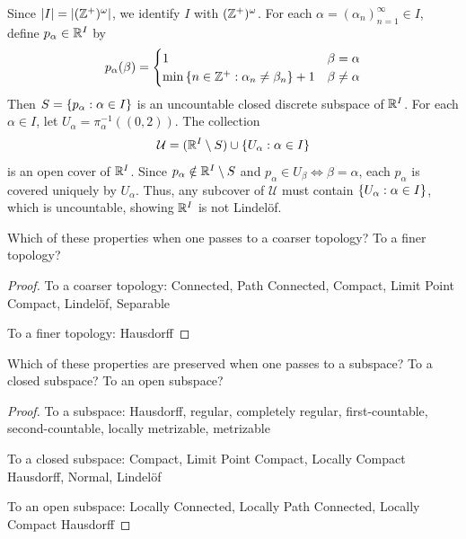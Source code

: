 \documentclass[12pt,a4paper]{article}
\begin{document}
\begin{ex}
\begin{itemize}
\begin{remark}
                Since $\left\lvert I\right\rvert=\left\lvert (\mathbb{Z}^+)^\omega\right\rvert$, we identify $I$ with $(\mathbb{Z}^+)^\omega$. For each $\alpha=(\alpha_n)_{n=1}^\infty\in I$, define $p_\alpha\in\mathbb{R}^I$ by
                $$
                p_\alpha(\beta) = \begin{cases}
                    1 & \beta=\alpha \\
                    \min\left\{n\in\mathbb{Z}^+:\alpha_n\neq\beta_n\right\}+1 & \beta\neq\alpha
                \end{cases}
                $$
                Then $S=\left\{p_\alpha:\alpha\in I\right\}$ is an uncountable closed discrete subspace of $\mathbb{R}^I$. For each $\alpha\in I$, let $U_\alpha=\pi_\alpha^{-1}((0,2))$. The collection
                $$
                \mathcal{U}=(\mathbb{R}^I\setminus S)\cup\left\{U_\alpha:\alpha\in I\right\}
                $$
                is an open cover of $\mathbb{R}^I$. Since $p_\alpha\notin\mathbb{R}^I\setminus S$ and $p_\alpha\in U_\beta\iff\beta=\alpha$, each $p_\alpha$ is covered uniquely by $U_\alpha$. Thus, any subcover of $\mathcal{U}$ must contain $\left\{U_\alpha:\alpha\in I\right\}$, which is uncountable, showing $\mathbb{R}^I$ is not Lindel\"of.
            \end{remark}
        \end{itemize}
    \end{ex}
    \hfill

    \begin{ex}
        Which of these properties when one passes to a coarser topology? To a finer topology?
    \end{ex}
    \begin{proof}
        To a coarser topology: Connected, Path Connected, Compact, Limit Point Compact, Lindel\"of, Separable

        To a finer topology: Hausdorff
    \end{proof}
    \hfill

    \begin{ex}
        Which of these properties are preserved when one passes to a subspace? To a closed subspace? To an open subspace?
    \end{ex}
    \begin{proof}
        To a subspace: Hausdorff, regular, completely regular, first-countable, second-countable, locally metrizable, metrizable

        To a closed subspace: Compact, Limit Point Compact, Locally Compact Hausdorff, Normal, Lindel\"of

        To an open subspace: Locally Connected, Locally Path Connected, Locally Compact Hausdorff
    \end{proof}
    \hfill
\end{document}
